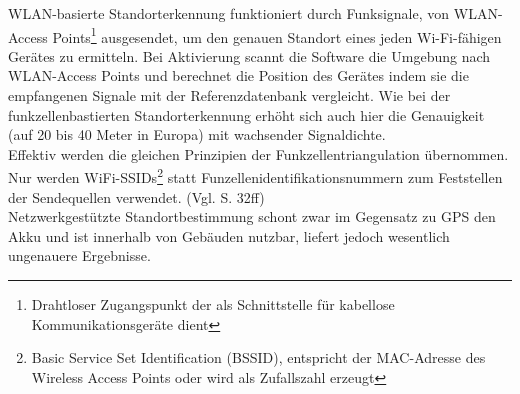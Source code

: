 \gls{WLAN}-basierte Standorterkennung funktioniert durch Funksignale, von \gls{WLAN}-Access Points\footnote{ Drahtloser Zugangspunkt der als Schnittstelle für kabellose Kommunikationsgeräte dient} ausgesendet, um den genauen Standort eines jeden Wi-Fi-fähigen Gerätes zu ermitteln. Bei Aktivierung scannt die Software die Umgebung nach \gls{WLAN}-Access Points und berechnet die Position des Gerätes indem sie die empfangenen Signale mit der Referenzdatenbank vergleicht. Wie bei der funkzellenbastierten Standorterkennung erhöht sich auch hier die Genauigkeit (auf 20 bis 40 Meter in Europa) mit wachsender Signaldichte. \\
Effektiv werden die gleichen Prinzipien der Funkzellentriangulation übernommen. Nur werden WiFi-SSIDs\footnote{ Basic Service Set Identification (BSSID), entspricht der MAC-Adresse des Wireless Access Points oder wird als Zufallszahl erzeugt} statt Funzellenidentifikationsnummern zum Feststellen der Sendequellen verwendet. (Vgl. \cite{gps} S. 32ff) \\
Netzwerkgestützte Standortbestimmung schont zwar im Gegensatz zu \gls{GPS} den Akku und ist innerhalb von Gebäuden nutzbar, liefert jedoch wesentlich ungenauere Ergebnisse.
